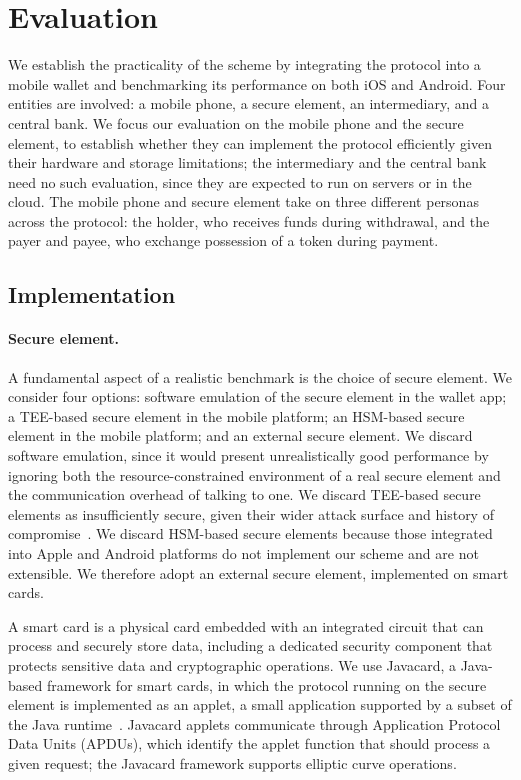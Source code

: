 \section{Evaluation}\label{sec:eval}

We establish the practicality of the scheme by integrating the protocol into
a mobile wallet and benchmarking its performance on both iOS and Android.
Four entities are
involved: a mobile phone, a secure element, an intermediary, and a central
bank. We focus our evaluation on the mobile phone and the secure element, to
establish whether they can implement the protocol efficiently given their
hardware and storage limitations; the intermediary and the central bank need
no such evaluation, since they are expected to run on servers or in the
cloud. The mobile phone and secure element take on three different personas
across the protocol: the holder, who receives funds during withdrawal, and
the payer and payee, who exchange possession of a token during payment.

\subsection{Implementation}

\paragraph{Secure element.} A fundamental aspect of a realistic benchmark is
the choice of secure element. We consider four options: software emulation
of the secure element in the wallet app; a TEE-based secure element in the
mobile platform; an HSM-based secure element in the mobile platform; and an
external secure element. We discard software emulation, since it would
present unrealistically good performance by ignoring both the
resource-constrained environment of a real secure element and the
communication overhead of talking to one. We discard TEE-based secure
elements as insufficiently secure, given their wider attack surface and
history of compromise~\cite{TEEsBad}. We discard HSM-based secure elements
because those integrated into Apple and Android platforms do not implement
our scheme and are not extensible. We therefore adopt an external secure
element, implemented on smart cards.

A smart card is a physical card embedded with an integrated circuit that can
process and securely store data, including a dedicated security component
that protects sensitive data and cryptographic operations. We use
Javacard, a Java-based framework for smart cards, in which
the protocol running on the secure element is implemented as an
applet, a small application supported by a subset of the Java
runtime~\cite{javacard}. Javacard applets communicate through Application Protocol Data
Units (APDUs), which identify the applet function that should process a
given request; the Javacard framework supports elliptic curve operations.

